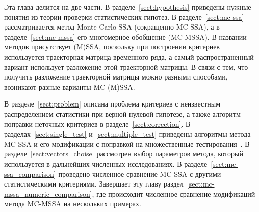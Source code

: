 \documentclass[specialist,
substylefile = spbu_report.rtx,
subf,href,colorlinks=true, 12pt]{disser}
\theoremstyle{definition}
\begin{document}
Эта глава делится на две части. В разделе~\ref{sect:hypothesis} приведены нужные понятия из теории проверки статистических гипотез. В разделе~\ref{sect:mc-ssa} рассматривается метод Monte-Carlo SSA (сокращенно MC-SSA), а в разделе~\ref{sect:mc-mssa} его многомерное обобщение (MC-MSSA). В названии методов присутствует (M)SSA, поскольку при построении критериев используется траекторная матрица временного ряда, а самый распространенный вариант использует разложение этой траекторной матрицы. В связи с тем, что получить разложение траекторной матрицы можно разными способами, возникают разные варианты MC-(M)SSA.

В разделе~\ref{sect:problem} описана проблема критериев с неизвестным распределением статистики при верной нулевой гипотезе, а также алгоритм поправки неточных критериев в разделе~\ref{sect:correction}. В разделах~\ref{sect:single_test} и~\ref{sect:multiple_test} приведены алгоритмы метода MC-SSA и его модификации с поправкой на множественные тестирования~\cite{Golyandina_2023}. В разделе~\ref{sect:vectors_choise} рассмотрен выбор параметров метода, который используется в дальнейших численных исследованиях. В разделе~\ref{sect:mc-ssa_comparison} проведено численное сравнение MC-SSA с другими статистическими критериями. Завершает эту главу раздел~\ref{sect:mc-mssa_numeric_comparison}, где происходит численное сравнение модификаций метода MC-MSSA на нескольких примерах.
\end{document}

